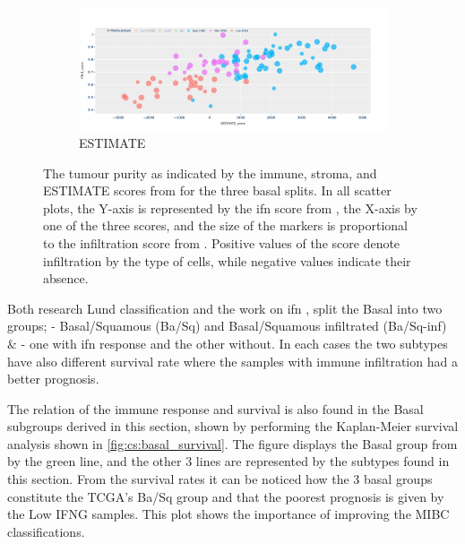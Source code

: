 \begin{figure}[H]
    \centering
    \begin{subfigure}[!t]{1.0\textwidth}
        \includegraphics[width=\textwidth,keepaspectratio]{Sections/ClusteringAnalysis/Resources/discussion/Estimate_spectrum.png}
        \caption{ESTIMATE}
        \label{fig:cs:estimate_basal}
    \end{subfigure}
    \centering
    \caption{The tumour purity as indicated by the immune, stroma, and ESTIMATE scores from \citet{Yoshihara2013-wq} for the three basal splits. In all scatter plots, the Y-axis is represented by the \acrshort{ifn} score from \citet{Baker2022-bj}, the X-axis by one of the three scores, and the size of the markers is proportional to the infiltration score from \citet{Robertson2017-mg}. Positive values of the score denote infiltration by the type of cells, while negative values indicate their absence.}
    \label{fig:cs:tumour_purity}
\end{figure}


Both research Lund classification \citet{Marzouka2018-ge} and the work on \acrshort{ifn} \citet{Baker2022-bj}, split the Basal into two groups; \citet{Marzouka2018-ge} - Basal/Squamous (Ba/Sq) and Basal/Squamous infiltrated (Ba/Sq-inf) \& \citet{Baker2022-bj} - one with \acrshort{ifn} response and the other without. In each cases the two subtypes have also different survival rate where the samples with immune infiltration had a better prognosis.

The relation of the immune response and survival is also found in the Basal subgroups derived in this section, shown by performing the Kaplan-Meier survival analysis shown in \cref{fig:cs:basal_survival}. The figure displays the Basal group
from \citet{Robertson2017-mg} by the green line, and the other 3 lines are represented by the subtypes found in this section. From the survival rates it can be noticed how the 3 basal groups constitute the TCGA's Ba/Sq group and that the poorest prognosis is given by the Low IFNG samples. This plot shows the importance of improving the MIBC classifications. 


